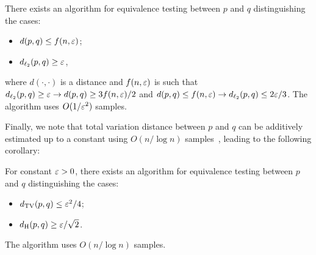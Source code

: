 \begin{corollary}\label{cor:l2-est}
There exists an algorithm for equivalence testing between $p$ and $q$ distinguishing the cases:
\begin{itemize}
\item $d(p,q) \leq f(n, \varepsilon)$;
\item $d_{\ell_2}(p,q) \geq \varepsilon$,
\end{itemize}
where $d(\cdot, \cdot)$ is a distance and $f(n, \varepsilon)$ is such that $d_{\ell_2}(p,q) \geq \varepsilon \rightarrow d(p,q) \geq 3f(n, \varepsilon)/2$ and $d(p,q) \leq f(n, \varepsilon) \rightarrow d_{\ell_2}(p,q) \leq 2\varepsilon/3$.  
The algorithm uses $O(1/\varepsilon^2)$ samples.
\end{corollary}

Finally, we note that total variation distance between $p$ and $q$ can be additively estimated up to a constant using $O(n/\log n)$ samples~\cite{LehmannC06, ValiantV11b, JiaoHW16}, leading to the following corollary:
\begin{corollary}\label{cor:tv-est}
For constant $\varepsilon > 0$, there exists an algorithm for equivalence testing between $p$ and $q$ distinguishing the cases:
\begin{itemize}
\item $d_{\mathrm {TV}}(p,q) \leq \varepsilon^2/4$;
\item $d_{\mathrm {H}}(p,q) \geq \varepsilon/\sqrt{2}$.
\end{itemize}
The algorithm uses $O(n/\log n)$ samples.
\end{corollary}
